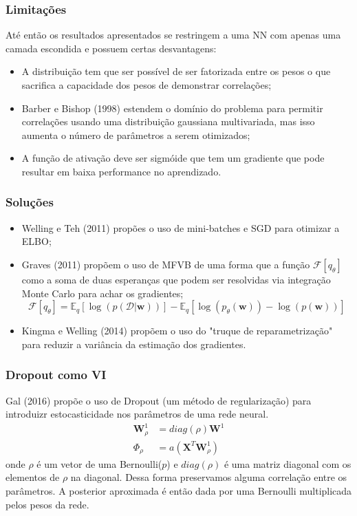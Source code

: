 \documentclass{beamer}
\begin{document}
\begin{frame}
    \frametitle{Limitações}

    Até então os resultados apresentados se restringem a uma NN com apenas uma camada escondida e possuem certas desvantagens:
    \begin{itemize}
        \item A distribuição tem que ser possível de ser fatorizada entre os pesos o que sacrifica a capacidade dos pesos de demonstrar correlações;
        \item Barber e Bishop (1998) estendem o domínio do problema para permitir correlações usando uma distribuição gaussiana multivariada, mas isso aumenta o número de parâmetros a serem otimizados;
        \item A função de ativação deve ser sigmóide que tem um gradiente que pode resultar em baixa performance no aprendizado.
    \end{itemize}
\end{frame}

\begin{frame}
    \frametitle{Soluções}

    \begin{itemize}
        \item Welling e Teh (2011) propões o uso de mini-batches e SGD para otimizar a ELBO;
        \item Graves (2011) propõem o uso de MFVB de uma forma que a função $\mathcal{F}[q_\theta]$ como a soma de duas esperanças que podem ser resolvidas via integração Monte Carlo para achar os gradientes;
        $$ \mathcal{F}[q_\theta] = \mathbb{E}_q [\log(p(\mathcal{D}|\mathbf{w}))] - \mathbb{E}_q [\log(p_\theta(\mathbf{w})) - \log(p(\mathbf{w}))] $$
        \item Kingma e Welling (2014) propõem o uso do "truque de reparametrização" para reduzir a variância da estimação dos gradientes.
    \end{itemize}
\end{frame}

\begin{frame}
    \frametitle{Dropout como VI}

    Gal (2016) propõe o uso de Dropout (um método de regularização) para introduizr estocasticidade nos parâmetros de uma rede neural.
    \begin{align*}
        \mathbf{W}^1_\rho &= diag(\rho)\mathbf{W}^1
        \\ \Phi_\rho &= a(\mathbf{X}^T\mathbf{W}^1_\rho)
    \end{align*}
    onde $\rho$ é um vetor de uma Bernoulli($p$) e $diag(\rho)$ é uma matriz diagonal com os elementos de $\rho$ na diagonal. Dessa forma preservamos alguma correlação entre os parâmetros.
    A posterior aproximada é então dada por uma Bernoulli multiplicada pelos pesos da rede.
\end{frame}
\end{document}
